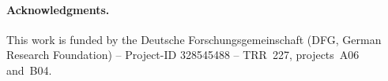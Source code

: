\documentclass[prl,twocolumn,floatfix]{revtex4-2}
\begin{document}
\paragraph{Acknowledgments.} This work is funded by the Deutsche Forschungsgemeinschaft (DFG, German Research Foundation) -- Project-ID 328545488 -- TRR~227, projects~A06 and~B04.

% 


\listoftodos
\end{document}
